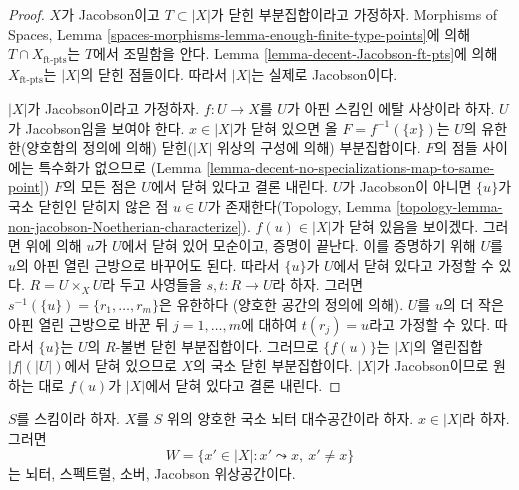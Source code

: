 \begin{proof}
$X$가 Jacobson이고 $T \subset |X|$가 닫힌 부분집합이라고 가정하자.
Morphisms of Spaces, Lemma
\ref{spaces-morphisms-lemma-enough-finite-type-points}에 의해
$T \cap X_{\text{ft-pts}}$는 $T$에서 조밀함을 안다.
Lemma \ref{lemma-decent-Jacobson-ft-pts}에 의해
$X_{\text{ft-pts}}$는 $|X|$의 닫힌 점들이다. 따라서 $|X|$는 실제로
Jacobson이다.

\medskip\noindent
$|X|$가 Jacobson이라고 가정하자. $f : U \to X$를 $U$가 아핀
스킴인 에탈 사상이라 하자. $U$가 Jacobson임을 보여야 한다.
$x \in |X|$가 닫혀 있으면 올 $F = f^{-1}(\{x\})$는 $U$의
유한한(양호함의 정의에 의해) 닫힌($|X|$ 위상의 구성에 의해)
부분집합이다. $F$의 점들 사이에는 특수화가 없으므로
(Lemma \ref{lemma-decent-no-specializations-map-to-same-point})
$F$의 모든 점은 $U$에서 닫혀 있다고 결론 내린다.
$U$가 Jacobson이 아니면 $\{u\}$가 국소 닫힌인 닫히지 않은 점
$u \in U$가 존재한다(Topology, Lemma
\ref{topology-lemma-non-jacobson-Noetherian-characterize}).
$f(u) \in |X|$가 닫혀 있음을 보이겠다. 그러면 위에 의해 $u$가
$U$에서 닫혀 있어 모순이고, 증명이 끝난다. 이를 증명하기 위해
$U$를 $u$의 아핀 열린 근방으로 바꾸어도 된다. 따라서
$\{u\}$가 $U$에서 닫혀 있다고 가정할 수 있다.
$R = U \times_X U$라 두고 사영들을 $s, t : R \to U$라 하자.
그러면 $s^{-1}(\{u\}) = \{r_1, \ldots, r_m\}$은 유한하다
(양호한 공간의 정의에 의해). $U$를 $u$의 더 작은 아핀 열린
근방으로 바꾼 뒤 $j = 1, \ldots, m$에 대하여 $t(r_j) = u$라고
가정할 수 있다. 따라서 $\{u\}$는 $U$의 $R$-불변 닫힌
부분집합이다. 그러므로 $\{f(u)\}$는 $|X|$의 열린집합
$|f|(|U|)$에서 닫혀 있으므로 $X$의 국소 닫힌 부분집합이다.
$|X|$가 Jacobson이므로 원하는 대로 $f(u)$가 $|X|$에서 닫혀 있다고
결론 내린다.
\end{proof}

\begin{lemma}
\label{lemma-punctured-spec}
$S$를 스킴이라 하자. $X$를 $S$ 위의 양호한 국소 뇌터 대수공간이라
하자. $x \in |X|$라 하자. 그러면
$$
W = \{x' \in |X| : x' \leadsto x,\ x' \not = x\}
$$
는 뇌터, 스펙트럴, 소버, Jacobson 위상공간이다.
\end{lemma}

